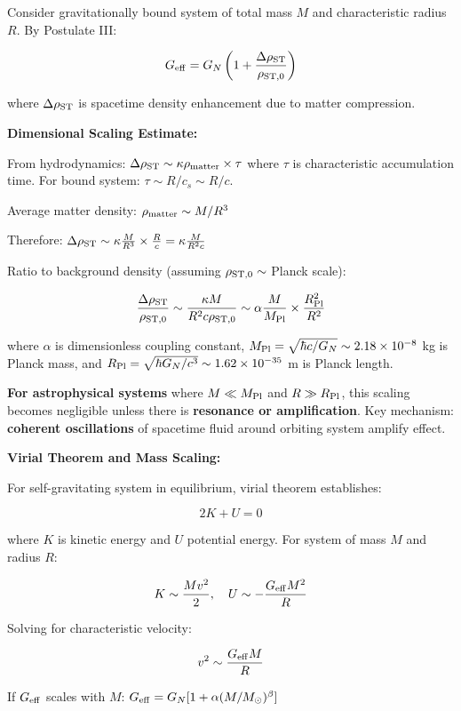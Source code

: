\documentclass[11pt,a4paper]{article}
\begin{document}
Consider gravitationally bound system of total mass \(M\) and
characteristic radius \(R\). By Postulate III:

\[G_{\rm eff} = G_N \left(1 + \frac{\Delta \rho_{\rm ST}}{\rho_{\rm ST,0}}\right)\]

where \(\Delta \rho_{\rm ST}\) is spacetime density enhancement due to
matter compression.

\textbf{Dimensional Scaling Estimate:}

From hydrodynamics:
\(\Delta \rho_{\rm ST} \sim \kappa \rho_{\rm matter} \times \tau\) where
\(\tau\) is characteristic accumulation time. For bound system:
\(\tau \sim R/c_s \sim R/c\).

Average matter density: \(\rho_{\rm matter} \sim M/R^3\)

Therefore:
\(\Delta \rho_{\rm ST} \sim \kappa \frac{M}{R^3} \times \frac{R}{c} = \kappa \frac{M}{R^2 c}\)

Ratio to background density (assuming \(\rho_{\rm ST,0} \sim\) Planck
scale):

\[\frac{\Delta \rho_{\rm ST}}{\rho_{\rm ST,0}} \sim \frac{\kappa M}{R^2 c \rho_{\rm ST,0}} \sim \alpha \frac{M}{M_{\rm Pl}} \times \frac{R_{\rm Pl}^2}{R^2}\]

where \(\alpha\) is dimensionless coupling constant,
\(M_{\rm Pl} = \sqrt{\hbar c/G_N} \sim 2.18 \times 10^{-8}\) kg is
Planck mass, and
\(R_{\rm Pl} = \sqrt{\hbar G_N/c^3} \sim 1.62 \times 10^{-35}\) m is
Planck length.

\textbf{For astrophysical systems} where \(M \ll M_{\rm Pl}\) and
\(R \gg R_{\rm Pl}\), this scaling becomes negligible unless there is
\textbf{resonance or amplification}. Key mechanism: \textbf{coherent
oscillations} of spacetime fluid around orbiting system amplify effect.

\textbf{Virial Theorem and Mass Scaling:}

For self-gravitating system in equilibrium, virial theorem establishes:

\[2 K + U = 0\]

where \(K\) is kinetic energy and \(U\) potential energy. For system of
mass \(M\) and radius \(R\):

\[K \sim \frac{M v^2}{2}, \quad U \sim -\frac{G_{\rm eff} M^2}{R}\]

Solving for characteristic velocity:

\[v^2 \sim \frac{G_{\rm eff} M}{R}\]

If \(G_{\rm eff}\) scales with \(M\):
\(G_{\rm eff} = G_N[1 + \alpha (M/M_\odot)^\beta]\)
\end{document}
